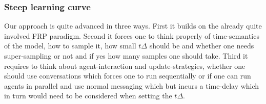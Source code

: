 \subsubsection{Steep learning curve}
Our approach is quite advanced in three ways. First it builds on the already quite involved FRP paradigm. Second it forces one to think properly of time-semantics of the model, how to sample it, how small $t \Delta$ should be and whether one needs super-sampling or not and if yes how many samples one should take. Third it requires to think about agent-interaction and update-strategies, whether one should use conversations which forces one to run sequentially or if one can run agents in parallel and use normal messaging which but incurs a time-delay which in turn would need to be considered when setting the $t \Delta$.